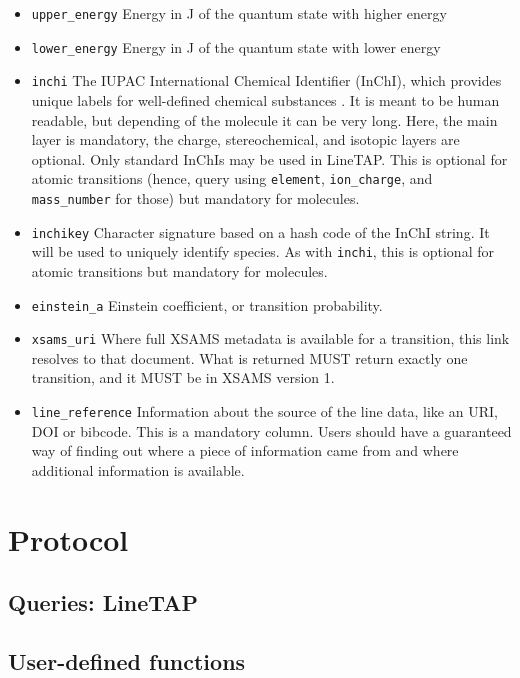 \documentclass[11pt,a4paper]{ivoa}
\begin{document}
\begin{itemize}
\item \texttt{upper\_energy} Energy  in J of the quantum state
with higher energy

\item \texttt{lower\_energy} Energy  in J of the quantum state
with lower energy

\item \texttt{inchi} The IUPAC International Chemical Identifier
(InChI), which  provides unique labels for well-defined chemical
substances \citep{INCHI}. It is meant to be human readable, but
depending of the molecule it can be very long.  Here, the main layer is
mandatory, the charge, stereochemical, and isotopic layers are optional.
Only standard InChIs may be used in LineTAP.  This is optional for
atomic transitions (hence, query using \texttt{element},
\texttt{ion\_charge}, and \texttt{mass\_number} for those) but mandatory
for molecules.

\item \texttt{inchikey} Character signature based on a hash code of
the InChI string. It will be used to uniquely identify species.  As with
\texttt{inchi}, this is optional for atomic transitions but mandatory
for molecules.

\item \texttt{einstein\_a} Einstein coefficient, or transition probability.

\item \texttt{xsams\_uri} Where full XSAMS metadata is available for a
transition, this link resolves to that document. What is returned MUST
return exactly one transition, and it MUST be in XSAMS version 1.

\item \texttt{line\_reference} Information about the source of the line data,
like an URI, DOI or bibcode.  This is a mandatory column.  Users should
have a guaranteed way of finding out where a piece of information came
from and where additional information is available.

\end{itemize}


\section{Protocol}
\label{sect:protocol}
\subsection{Queries: LineTAP}

\subsection{User-defined functions}
\label{sect:udfs}
\end{document}
